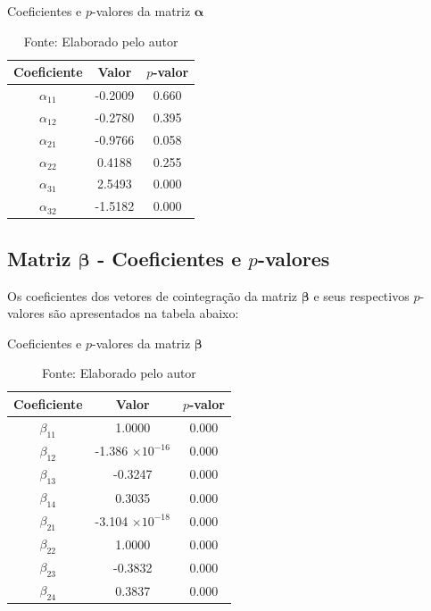 \documentclass[a4paper, 12pt, openany, oneside, brazil]{abntex2}
\begin{document}
\begin{apendicesenv}
\begin{table}[h!]
	\centering
	\caption{Coeficientes e \(p\)-valores da matriz $\mathbf{\alpha}$}
	\begin{tabular}{|c|c|c|}
		\hline
		\textbf{Coeficiente} & \textbf{Valor} & \textbf{\(p\)-valor} \\ \hline
		$\alpha_{11}$ & -0.2009 & 0.660 \\ \hline
		$\alpha_{12}$ & -0.2780 & 0.395 \\ \hline
		$\alpha_{21}$ & -0.9766 & 0.058 \\ \hline
		$\alpha_{22}$ &  0.4188 & 0.255 \\ \hline
		$\alpha_{31}$ &  2.5493 & 0.000 \\ \hline
		$\alpha_{32}$ & -1.5182 & 0.000 \\ \hline
	\end{tabular}
	\caption*{Fonte: Elaborado pelo autor}
\end{table}

\subsection{Matriz $\mathbf{\beta}$ - Coeficientes e $p$-valores}

Os coeficientes dos vetores de cointegração da matriz $\mathbf{\beta}$ e seus respectivos \(p\)-valores são apresentados na tabela abaixo:

\begin{table}[h!]
	\centering
	\caption{Coeficientes e $p$-valores da matriz $\mathbf{\beta}$}
	\begin{tabular}{|c|c|c|}
		\hline
		\textbf{Coeficiente} & \textbf{Valor} & \textbf{\(p\)-valor} \\ \hline
		$\beta_{11}$ & 1.0000 & 0.000 \\ \hline
		$\beta_{12}$ & -1.386 $\times 10^{-16}$ & 0.000 \\ \hline
		$\beta_{13}$ & -0.3247 & 0.000 \\ \hline
		$\beta_{14}$ & 0.3035 & 0.000 \\ \hline
		$\beta_{21}$ & -3.104 $\times 10^{-18}$ & 0.000 \\ \hline
		$\beta_{22}$ & 1.0000 & 0.000 \\ \hline
		$\beta_{23}$ & -0.3832 & 0.000 \\ \hline
		$\beta_{24}$ & 0.3837 & 0.000 \\ \hline
	\end{tabular}
	\caption*{Fonte: Elaborado pelo autor}
\end{table}


\end{apendicesenv}
\end{document}
